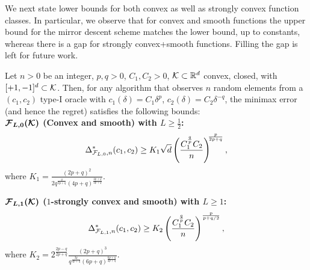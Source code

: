 We next state lower bounds for both convex as well as strongly convex function classes. In particular, we observe that for convex and smooth functions the upper bound for the mirror descent scheme matches the lower bound, up to constants, whereas there is a gap for strongly convex+smooth functions.
Filling the gap is left for future work.
\begin{theorem}
\label{thm:lb-convex}
Let $n>0$ be an integer, $p,q>0$, $C_1,C_2>0$, 
$\mathcal{K}\subset \mathbb{R}^d$ convex, closed, with  $[+1,-1]^d\subset \mathcal{K}$.
Then, for any algorithm that observes $n$ random elements from a $(c_1,c_2)$ type-I oracle 
 with $c_1(\delta) = C_1 \delta^p$, $c_2(\delta) = C_2 \delta^{-q}$,
 the minimax error (and hence the regret) satisfies the following bounds:\\
\textbf{$\bm{\mathcal{F}_{L,0}(\mathcal{K})}$ (Convex and smooth) with $L\ge \frac12$:}
\[
 \Delta_{\mathcal{F}_{L,0},n}^{*}(c_1,c_2) \ge K_1\sqrt{d}\left(\dfrac{C_1^{\frac{q}{p}}C_2}{n}\right)^{\!\!\frac{p}{2p+q}},
\]
where $K_1 = \frac{\left(2p+q\right)^2}{2q^{\frac{q}{2p+q}}\left(4p+q\right)^{\frac{4p+q}{2p+q}}}$.

\textbf{$\bm{\mathcal{F}_{L,1}(\mathcal{K})}$ ($1$-strongly convex and smooth) with $L\ge 1$:}
\[
\Delta_{\mathcal{F}_{L,1}, n}^{*}(c_1,c_2) \ge K_2 \left(\dfrac{C_1^{\frac{q}{p}} C_2}{n} \right)^{\frac{p}{p+q/2}}, 
\]
where $K_2 = 2^{\frac{2p-q}{2p+q}} \frac{(2p+q)^3}{q^{\frac{2q}{2p+q}}(6p+q)^{\frac{6p+q}{2p+q}}} $.
\end{theorem}
